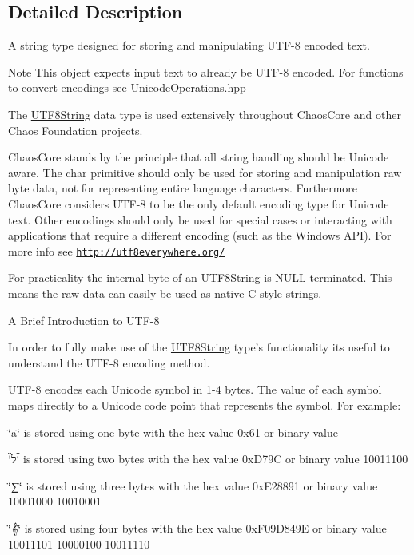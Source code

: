 \subsection{Detailed Description}
A string type designed for storing and manipulating U\-T\-F-\/8 encoded text. 

\begin{DoxyNote}{Note}
This object expects input text to already be U\-T\-F-\/8 encoded. For functions to convert encodings see \hyperlink{_unicode_operations_8hpp}{Unicode\-Operations.\-hpp}
\end{DoxyNote}
The \hyperlink{classchaos_1_1str_1_1_u_t_f8_string}{U\-T\-F8\-String} data type is used extensively throughout Chaos\-Core and other Chaos Foundation projects.

Chaos\-Core stands by the principle that all string handling should be Unicode aware. The {\ttfamily char} primitive should only be used for storing and manipulation raw byte data, not for representing entire language characters. Furthermore Chaos\-Core considers U\-T\-F-\/8 to be the only default encoding type for Unicode text. Other encodings should only be used for special cases or interacting with applications that require a different encoding (such as the Windows A\-P\-I). For more info see \href{http://utf8everywhere.org/}{\tt http\-://utf8everywhere.\-org/}

For practicality the internal byte of an \hyperlink{classchaos_1_1str_1_1_u_t_f8_string}{U\-T\-F8\-String} is N\-U\-L\-L terminated. This means the raw data can easily be used as native C style strings.

\begin{DoxyParagraph}{A Brief Introduction to U\-T\-F-\/8}

\end{DoxyParagraph}
In order to fully make use of the \hyperlink{classchaos_1_1str_1_1_u_t_f8_string}{U\-T\-F8\-String} type's functionality its useful to understand the U\-T\-F-\/8 encoding method.

U\-T\-F-\/8 encodes each Unicode symbol in 1-\/4 bytes. The value of each symbol maps directly to a Unicode code point that represents the symbol. For example\-:


\begin{DoxyItemize}
\item \char`\"{}a\char`\"{} is stored using one byte with the hex value 0x61 or binary value {}
\item \char`\"{}ל\char`\"{} is stored using two bytes with the hex value 0x\-D79\-C or binary value { 10011100}
\item \char`\"{}∑\char`\"{} is stored using three bytes with the hex value 0x\-E28891 or binary value { 10001000 10010001}
\item \char`\"{}𝄞\char`\"{} is stored using four bytes with the hex value 0x\-F09\-D849\-E or binary value { 10011101 10000100 10011110}
\end{DoxyItemize}


